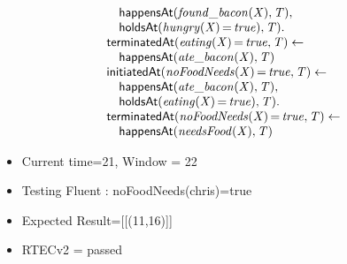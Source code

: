 \documentclass[8pt]{beamer}
\DeclareMathOperator{\val}{=}  %
\def \patsize {}
\def\happensAt{\textsf{\patsize happensAt}}
\def\holdsAt{\textsf{\patsize holdsAt}}
\def\initiatedAt{\textsf{\patsize initiatedAt}}
\def\terminatedAt{\textsf{\patsize terminatedAt}}
\newenvironment{mysplit}%
  {\arraycolsep 0pt \begin{array}{l}}%
  {\end{array}}
\begin{document}
\begin{frame}
\begin{minipage}{0.55\linewidth}
\begin{align*}
\begin{mysplit}
                \quad    \happensAt\mathit{(found\_bacon(X),T),}\\
                \quad    \holdsAt\mathit{(hungry(X)\val true),T).}\\
                \terminatedAt\mathit{(eating(X)\val true,T)\leftarrow}\\
                \quad    \happensAt\mathit{(ate\_bacon(X),T)}\\
                \initiatedAt\mathit{(noFoodNeeds(X)\val true,T)\leftarrow}\\
                \quad    \happensAt\mathit{(ate\_bacon(X),T),}\\
                \quad    \holdsAt\mathit{(eating(X)\val true),T).}\\
                \terminatedAt\mathit{(noFoodNeeds(X)\val true,T)\leftarrow}\\
                \quad    \happensAt\mathit{(needsFood(X),T)}\\
            \end{mysplit}
        \end{align*}
    \end{minipage}
    \begin{itemize}
        \item Current time=21, Window = 22
        \item Testing Fluent :  noFoodNeeds(chris)=true
        \item Expected Result=[[(11,16)]]
        \item RTECv2 = passed
    \end{itemize}
\end{frame}
\end{document}
